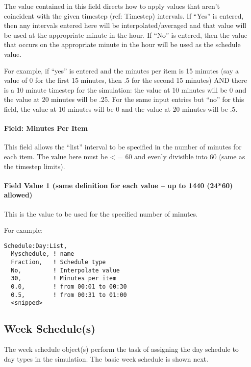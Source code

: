 The value contained in this field directs how to apply values that aren't coincident with the given timestep (ref: Timestep) intervals. If ``Yes'' is entered, then any intervals entered here will be interpolated/averaged and that value will be used at the appropriate minute in the hour. If ``No'' is entered, then the value that occurs on the appropriate minute in the hour will be used as the schedule value.

For example, if ``yes'' is entered and the minutes per item is 15 minutes (say a value of 0 for the first 15 minutes, then .5 for the second 15 minutes) AND there is a 10 minute timestep for the simulation: the value at 10 minutes will be 0 and the value at 20 minutes will be .25. For the same input entries but ``no'' for this field, the value at 10 minutes will be 0 and the value at 20 minutes will be .5.

\paragraph{Field: Minutes Per Item}\label{field-minutes-per-item}

This field allows the ``list'' interval to be specified in the number of minutes for each item. The value here must be \textless{} = 60 and evenly divisible into 60 (same as the timestep limits).

\paragraph{Field Value 1 (same definition for each value -- up to 1440 (24*60) allowed)}\label{field-value-1-same-definition-for-each-value-up-to-1440-2460-allowed}

This is the value to be used for the specified number of minutes.

For example:

\begin{lstlisting}
Schedule:Day:List,
  Myschedule, ! name
  Fraction,   ! Schedule type
  No,         ! Interpolate value
  30,         ! Minutes per item
  0.0,        ! from 00:01 to 00:30
  0.5,        ! from 00:31 to 01:00
  <snipped>
\end{lstlisting}

\subsection{Week Schedule(s)}\label{week-schedules}

The week schedule object(s) perform the task of assigning the day schedule to day types in the simulation. The basic week schedule is shown next.

